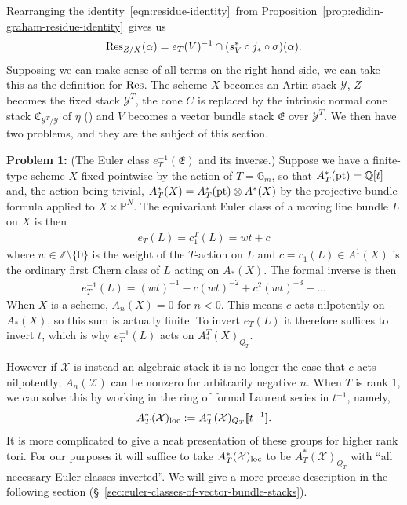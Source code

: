 \documentclass[12pt,dvipsnames]{amsart}
\begin{document}
Rearranging the identity~\ref{eqn:residue-identity}~from Proposition~\ref{prop:edidin-graham-residue-identity}~gives us
\begin{equation}\label{eqn:residue-identity-with-residue-isolated}
  \operatorname{Res}_{Z/X}(\alpha) = e_T(V)^{-1}\cap (s^*_V\circ j_*\circ \sigma)(\alpha).
\end{equation}
Supposing we can make sense of all terms on the right hand side, we can take this as the definition for \(\operatorname{Res}\). The scheme \(X\) becomes an Artin stack \(\mathcal Y\), \(Z\) becomes the fixed stack \(\mathcal Y^T\), the cone \(C\) is replaced by the intrinsic normal cone stack \(\mathfrak C_{\mathcal Y^T/\mathcal Y}\) of \(\eta\) (\cite[Definition 2.30]{manolache_VirtualPullbacks2012}) and \(V\) becomes a vector bundle stack \(\mathfrak E\) over \(\mathcal Y^T\). We then have two problems, and they are the subject of this section.

\bigskip

\noindent\textbf{Problem 1:} (The Euler class \(e^{-1}_T(\mathfrak E)\) and its inverse.) Suppose we have a finite-type scheme \(X\) fixed pointwise by the action of \(T = \mathbb G_m\), so that \(A^*_T(\operatorname{pt}) = \mathbb Q[t]\) and, the action being trivial, \(A^*_T(X) = A^*_T(\operatorname{pt})\otimes A^*(X)\) by the projective bundle formula applied to \(X\times \mathbb P^N\). The equivariant Euler class of a moving line bundle \(L\) on \(X\) is then
\begin{align*}
  e_T(L) = c_1^T(L) = wt + c
\end{align*}
where \(w\in \mathbb Z\setminus\{0\}\) is the weight of the \(T\)-action on \(L\) and \(c = c_1(L)\in A^1(X)\) is the ordinary first Chern class of \(L\) acting on \(A_*(X)\). The formal inverse is then
\begin{align*}
  e_T^{-1}(L) = (wt)^{-1} - c(wt)^{-2} + c^2(wt)^{-3} - \dots
\end{align*}
When \(X\) is a scheme, \(A_n(X) = 0\) for \(n < 0\). This means \(c\) acts nilpotently on \(A_*(X)\), so this sum is actually finite. To invert \(e_T(L)\) it therefore suffices to invert \(t\), which is why \(e^{-1}_T(L)\) acts on \(A^T_*(X)_{Q_T}\).

However if \(\mathcal X\) is instead an algebraic stack it is no longer the case that \(c\) acts nilpotently; \(A_n(\mathcal X)\) can be nonzero for arbitrarily negative \(n\). When \(T\) is rank 1, we can solve this by working in the ring of formal Laurent series in \(t^{-1}\), namely,
\[A^*_T(\mathcal X)_{\operatorname{loc}} := A^*_T(\mathcal X)_{Q_T}[\hspace{-2pt}[t^{-1}]\hspace{-2.5pt}].\]
It is more complicated to give a neat presentation of these groups for higher rank tori. For our purposes it will suffice to take \( A^*_T(\mathcal X)_{\operatorname{loc}}\) to be \(A^*_T(\mathcal X)_{Q_T}\) with ``all necessary Euler classes inverted''. We will give a more precise description in the following section (\S~\ref{sec:euler-classes-of-vector-bundle-stacks}).
\end{document}
